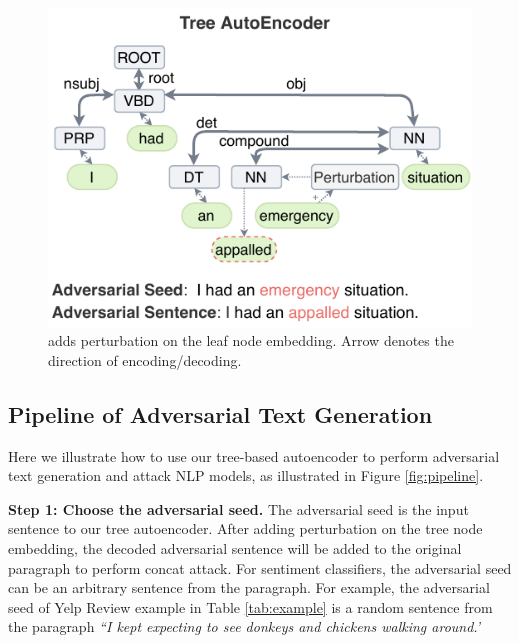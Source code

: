 \begin{figure}
    \centering
    \includegraphics[width=\linewidth]{body/pipelineword.pdf}
    \caption{\small \advcodecword adds perturbation on the leaf node embedding. Arrow denotes the direction of encoding/decoding.  }
    \label{fig:advword}
    \vspace{-3mm}
\end{figure}

\subsection{Pipeline of Adversarial Text Generation}

Here we illustrate how to use our tree-based autoencoder to perform adversarial text generation and attack NLP models, as illustrated in Figure \ref{fig:pipeline}.

\textbf{Step 1: Choose the adversarial seed.} The adversarial seed is the input sentence to our tree autoencoder. After adding perturbation on the tree node embedding, the decoded adversarial sentence will be added to the original paragraph to perform concat attack. For sentiment classifiers, the adversarial seed can be an arbitrary sentence from the paragraph. For example, the adversarial seed of Yelp Review example in Table \ref{tab:example} is a random sentence from the paragraph \textit{``I kept expecting to see donkeys and chickens walking around.'}

